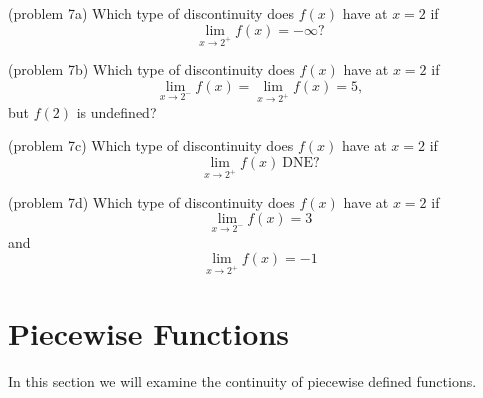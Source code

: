 \documentclass[handout]{ximera}
\begin{document}

\begin{problem}(problem 7a)
Which type of discontinuity does $f(x)$ have at $x=2$ if
\[
\lim_{x \to 2^+} f(x) = -\infty?
\]

\begin{multipleChoice}
\end{multipleChoice}
\end{problem}

\begin{problem}(problem 7b)
Which type of discontinuity does $f(x)$ have at $x=2$ if
\[
\lim_{x \to 2^-} f(x) = \lim_{x \to 2^+} f(x) = 5,
\]
but $f(2)$ is undefined?
\begin{multipleChoice}
\end{multipleChoice}
\end{problem}

\begin{problem}(problem 7c)
Which type of discontinuity does $f(x)$ have at $x=2$ if
\[
\lim_{x \to 2^+} f(x) \ \text{DNE}?
\]

\begin{multipleChoice}
\end{multipleChoice}
\end{problem}

\begin{problem}(problem 7d)
Which type of discontinuity does $f(x)$ have at $x=2$ if
\[
\lim_{x \to 2^-} f(x) = 3
\]
and
\[
\lim_{x \to 2^+} f(x) = -1
\]
\begin{multipleChoice}
\end{multipleChoice}
\end{problem}



\section{Piecewise Functions}


In this section we will examine the continuity of piecewise defined functions.
\end{document}
